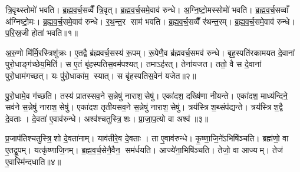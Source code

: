 

\clearpage
{}
\setcounter{anuvakam}{0}
त्रि॒वृथ्स्तोमो॑ भवति। ब्र॒ह्म॒व॒र्च॒सव्वैँ त्रि॒वृत्। ब्र॒ह्म॒व॒र्च॒समे॒वाव॑ रुन्धे। अ॒ग्नि॒ष्टो॒मस्सोमो॑ भवति। ब्र॒ह्म॒व॒र्च॒सव्वाँ अ॑ग्निष्टो॒मः। ब्र॒ह्म॒व॒र्च॒समे॒वाव॑ रुन्धे। र॒थ॒न्त॒र साम॑ भवति। ब्र॒ह्म॒व॒र्च॒सव्वैँ र॑थन्त॒रम्। ब्र॒ह्म॒व॒र्च॒समे॒वाव॑ रुन्धे। प॒रि॒स्र॒जी होता॑ भवति॥१॥

अ॒रु॒णो मि॑र्मि॒रस्त्रिशु॑क्रः। ए॒तद्वै ब्र॑ह्मवर्च॒सस्य॑ रू॒पम्। रू॒पेणै॒व ब्र॑ह्मवर्च॒समव॑ रुन्धे। बृह॒स्पति॑रकामयत दे॒वानां पुरो॒धाङ्ग॑च्छेय॒मिति॑। स ए॒तं बृ॑हस्पतिस॒वम॑पश्यत्। तमाऽह॑रत्। तेना॑यजत। ततो॒ वै स दे॒वानां पुरो॒धाम॑गच्छत्। यः पु॑रो॒धाका॑म॒ स्यात्। स बृ॑हस्पतिस॒वेन॑ यजेत॥२॥

पु॒रो॒धामे॒व ग॑च्छति। तस्य॑ प्रातस्सव॒ने स॒न्नेषु॑ नाराश॒सेषु॑। एका॑दश॒ दख्षि॑णा नीयन्ते। एका॑दश॒ माध्य॑न्दिने॒ सव॑ने स॒न्नेषु॑ नाराश॒सेषु॑। एका॑दश तृतीयसव॒ने स॒न्नेषु॑ नाराश॒सेषु॑। त्रय॑स्त्रिश॒थ्संप॑द्यन्ते। त्रय॑स्त्रिश॒द्वै दे॒वताः। दे॒वता॑ ए॒वाव॑रुन्धे। अश्व॑श्चतुस्त्रि॒शः। प्रा॒जा॒प॒त्यो वा अश्व॑॥३॥

प्र॒जाप॑तिश्चतुस्त्रि॒शो दे॒वता॑नाम्। याव॑तीरे॒व दे॒वताः। ता ए॒वाव॑रुन्धे। कृ॒ष्णा॒जि॒ने॑ऽभिषि॑ञ्चति। ब्रह्म॑णो॒ वा ए॒तद्रू॒पम्। यत्कृ॑ष्णाजि॒नम्। ब्र॒ह्म॒व॒र्च॒सेनै॒वैन॒ सम॑र्धयति। आज्ये॑ना॒भिषि॑ञ्चति। तेजो॒ वा आज्यम्। तेज॑ ए॒वास्मि॑न्दधाति॥४॥\anuvakamend[होता॑ भवति यजेत॒ वा अश्वो॑ दधाति]

